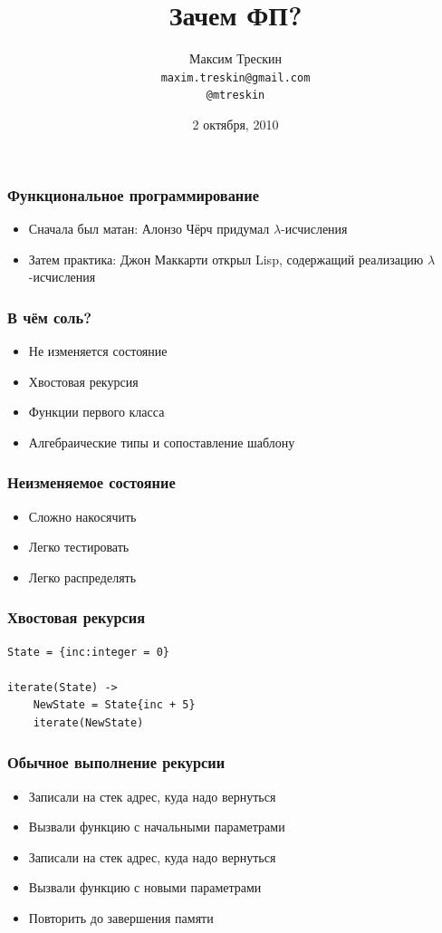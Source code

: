 \documentclass{beamer}
\title{Зачем ФП?}
\author{Максим Трескин\\ \texttt{maxim.treskin@gmail.com} \\ \texttt{@mtreskin}}
\date[2010.10.02]{2 октября, 2010}
\begin{document}
\begin{frame}
  \titlepage
\end{frame}




\begin{frame}
  \frametitle{Функциональное программирование}
  \begin{itemize}
  \item Сначала был матан: Алонзо Чёрч придумал $\lambda$-исчисления
    \pause
  \item Затем практика: Джон Маккарти открыл Lisp, содержащий реализацию $\lambda$-исчисления
  \end{itemize}
\end{frame}


\begin{frame}
  \frametitle{В чём соль?}
  \begin{itemize}
  \item Не изменяется состояние
    \pause
  \item Хвостовая рекурсия
    \pause
  \item Функции первого класса
    \pause
  \item Алгебраические типы и сопоставление шаблону
  \end{itemize}
\end{frame}

\begin{frame}
  \frametitle{Неизменяемое состояние}
  \begin{itemize}
  \item Сложно накосячить
    \pause
  \item Легко тестировать
    \pause
  \item Легко распределять
  \end{itemize}
\end{frame}


\begin{frame}[fragile]
  \frametitle{Хвостовая рекурсия}
  \begin{block}{}
\begin{verbatim}
State = {inc:integer = 0}

iterate(State) ->
    NewState = State{inc + 5}
    iterate(NewState)
\end{verbatim}
  \end{block}

\end{frame}


\begin{frame}
  \frametitle{Обычное выполнение рекурсии}
  \begin{itemize}
  \item Записали на стек адрес, куда надо вернуться
    \pause
  \item Вызвали функцию с начальными параметрами
    \pause
  \item Записали на стек адрес, куда надо вернуться
    \pause
  \item Вызвали функцию с новыми параметрами
    \pause
  \item Повторить до завершения памяти
  \end{itemize}
\end{frame}
\end{document}
